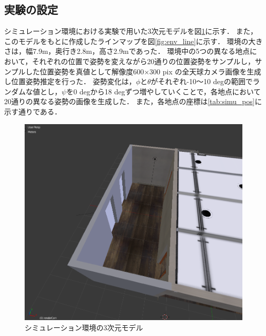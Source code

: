 \subsection{実験の設定}

シミュレーション環境における実験で用いた3次元モデルを図\ref{fig:env_model}に示す．
また，このモデルをもとに作成したラインマップを図\ref{fig:env_line}に示す．
環境の大きさは，幅7.9m，奥行き2.8m，高さ2.9mであった．
環境中の5つの異なる地点において，それぞれの位置で姿勢を変えながら20通りの位置姿勢をサンプルし，サンプルした位置姿勢を真値として解像度600$\times$300 pix の全天球カメラ画像を生成し位置姿勢推定を行った．
姿勢変化は，$\phi$と$\theta$がそれぞれ-10～10 degの範囲でランダムな値とし，$\psi$を0 degから18 degずつ増やしていくことで，各地点において20通りの異なる姿勢の画像を生成した．
また，各地点の座標は\ref{tab:simu_pos}に示す通りである．
\\

\begin{figure}[b]
 \begin{center}
 \includegraphics[width=0.6\columnwidth]{./chap5/fig/blender_room_2.png}
 \caption{シミュレーション環境の3次元モデル}
 \label{fig:env_model}
 \end{center}
 \vspace{-5mm}
\end{figure}

